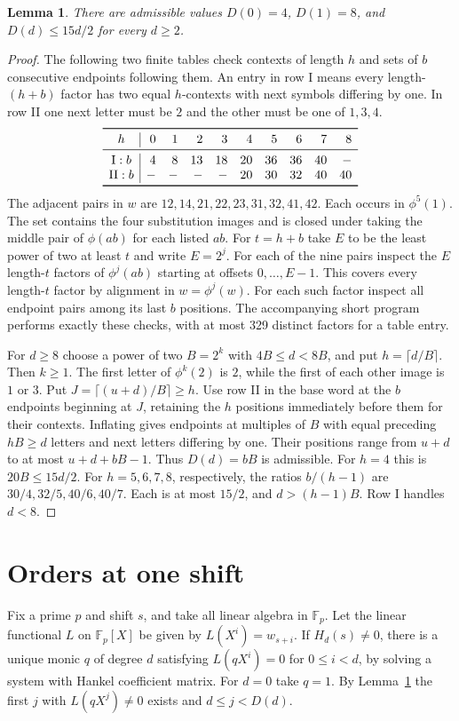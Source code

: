 \documentclass[11pt]{article}
\newtheorem{lemma}[theorem]{Lemma}
\newcommand{\F}{\mathbb F}
\begin{document}
\begin{lemma}\label{bound}
There are admissible values $D(0)=4$, $D(1)=8$, and $D(d)\le 15d/2$ for every $d\ge2$.
\end{lemma}
\begin{proof}
The following two finite tables check contexts of length $h$ and sets of $b$ consecutive endpoints following them. An entry in row I means every length-$(h+b)$ factor has two equal $h$-contexts with next symbols differing by one. In row II one next letter must be $2$ and the other must be one of $1,3,4$.
\[
\begin{array}{c|rrrrrrrrr}\toprule
h&0&1&2&3&4&5&6&7&8\\\midrule
{\rm I}: b&4&8&13&18&20&36&36&40&-\\
{\rm II}: b&-&-&-&-&20&30&32&40&40\\\bottomrule
\end{array}
\]
The adjacent pairs in $w$ are
$12,14,21,22,23,31,32,41,42$. Each occurs in $\phi^5(1)$. The set contains the four substitution images and is closed under taking the middle pair of $\phi(ab)$ for each listed $ab$. For $t=h+b$ take $E$ to be the least power of two at least $t$ and write $E=2^j$. For each of the nine pairs inspect the $E$ length-$t$ factors of $\phi^j(ab)$ starting at offsets $0,\ldots,E-1$. This covers every length-$t$ factor by alignment in $w=\phi^j(w)$. For each such factor inspect all endpoint pairs among its last $b$ positions. The accompanying short program performs exactly these checks, with at most 329 distinct factors for a table entry.

For $d\ge8$ choose a power of two $B=2^k$ with $4B\le d<8B$, and put $h=\lceil d/B\rceil$. Then $k\ge1$. The first letter of $\phi^k(2)$ is $2$, while the first of each other image is $1$ or $3$. Put $J=\lceil(u+d)/B\rceil\ge h$. Use row II in the base word at the $b$ endpoints beginning at $J$, retaining the $h$ positions immediately before them for their contexts. Inflating gives endpoints at multiples of $B$ with equal preceding $hB\ge d$ letters and next letters differing by one. Their positions range from $u+d$ to at most $u+d+bB-1$. Thus $D(d)=bB$ is admissible. For $h=4$ this is $20B\le15d/2$. For $h=5,6,7,8$, respectively, the ratios $b/(h-1)$ are $30/4,32/5,40/6,40/7$. Each is at most $15/2$, and $d>(h-1)B$. Row I handles $d<8$.
\end{proof}

\section{Orders at one shift}
Fix a prime $p$ and shift $s$, and take all linear algebra in $\F_p$. Let the linear functional $L$ on $\F_p[X]$ be given by $L(X^i)=w_{s+i}$. If $H_d(s)\ne0$, there is a unique monic $q$ of degree $d$ satisfying
$L(qX^i)=0$ for $0\le i<d$, by solving a system with Hankel coefficient matrix. For $d=0$ take $q=1$. By Lemma~\ref{bound} the first $j$ with $L(qX^j)\ne0$ exists and $d\le j<D(d)$.
\end{document}
